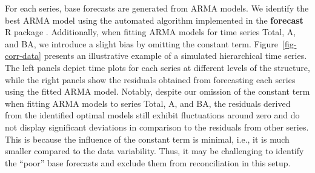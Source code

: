 \documentclass[
  11pt]{article}
\begin{document}
For each series, base forecasts are generated from ARMA models. We
identify the best ARMA model using the automated algorithm implemented
in the \textbf{forecast} R package \citep{HK08}. Additionally, when
fitting ARMA models for time series Total, A, and BA, we introduce a
slight bias by omitting the constant term. Figure~\ref{fig-corr-data}
presents an illustrative example of a simulated hierarchical time
series. The left panels depict time plots for each series at different
levels of the structure, while the right panels show the residuals
obtained from forecasting each series using the fitted ARMA model.
Notably, despite our omission of the constant term when fitting ARMA
models to series Total, A, and BA, the residuals derived from the
identified optimal models still exhibit fluctuations around zero and do
not display significant deviations in comparison to the residuals from
other series. This is because the influence of the constant term is
minimal, i.e., it is much smaller compared to the data variability.
Thus, it may be challenging to identify the ``poor'' base forecasts and
exclude them from reconciliation in this setup.
\end{document}
